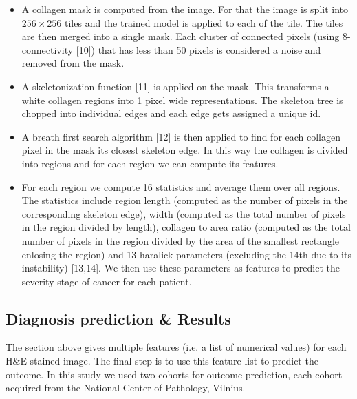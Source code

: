 \documentclass{article}
\begin{document}
\begin{itemize}
    
\item A collagen mask is computed from the image. For that the image is split
      into $256 \times 256$ tiles and the trained model is applied to each
      of the tile. The tiles are then merged into a single mask. Each cluster of
      connected pixels (using 8-connectivity [10]) that has less than 50 pixels is considered a
      noise and removed from the mask.

\item A skeletonization function [11] is applied on the mask. This transforms
      a white collagen regions into 1 pixel wide representations. The skeleton
      tree is chopped into individual edges and each edge gets assigned a
      unique id.

\item A breath first search algorithm [12] is then applied to find for each collagen
      pixel in the mask its closest skeleton edge. In this way the collagen
      is divided into regions and for each region we can compute its
      features.

\item For each region we compute 16 statistics and average them over all regions. The statistics
      include region length (computed as the number of pixels in the corresponding skeleton 
      edge), width (computed as the total number of pixels in the region divided by length),
      collagen to area ratio (computed as the total number of pixels in the region divided by
      the area of the smallest rectangle enlosing the region) and 13 haralick parameters
      (excluding the 14th due to its instability) [13,14]. We then use these parameters as
      features to predict the severity stage of cancer for each patient.

\end{itemize}


\subsection{Diagnosis prediction \& Results}

The section above gives multiple features (i.e. a list of numerical values) for
each H\&E stained image. The final step is to use this feature list to predict
the outcome. In this study we used two cohorts for outcome prediction, each cohort
acquired from the National Center of Pathology, Vilnius. 
\end{document}
